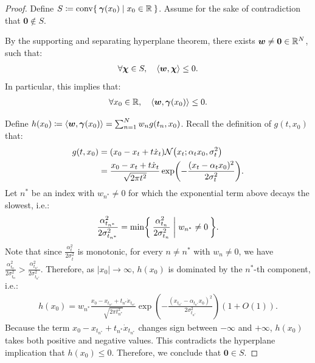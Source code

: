 \begin{proof}
Define $S \coloneqq \mathrm{conv} \Set{\vgamma(x_0) | x_0 \in \R }$.
Assume for the sake of contradiction that $\bm{0} \notin S$.

By the supporting and separating hyperplane theorem, there exists ${\bm{w}} \neq \bm{0} \in \mathbb{R}^N$, such that:
\begin{align}
    \forall {\bm{\chi}} \in S,\quad \langle {\bm{w}}, {\bm{\chi}} \rangle \leq 0.
\end{align}
In particular, this implies that:
\begin{align}
    \forall x_0 \in \mathbb{R},\quad \langle {\bm{w}}, {\bm{\gamma}}(x_0) \rangle \leq 0.
\end{align}

Define $h(x_0) \coloneqq \langle {\bm{w}}, {\bm{\gamma}}(x_0) \rangle = \sum_{n=1}^N w_n g(t_n,x_0)$. Recall the definition of $g(t,x_0)$ that:
\begin{align}
    g(t,x_0) &= (x_0 - x_t + t \dot{x}_t) \mathcal{N}\left(x_t; \alpha_t x_0, \sigma_t^2\right) \notag \\
    &= \frac{x_0 - x_t + t \dot{x}_t}{\sqrt{2\pi t^2}} \exp\left(-\frac{(x_t - \alpha_t x_0)^2}{2\sigma_t^2}\right).
\end{align}
Let $n^\ast$ be an index with $w_{n^\ast} \neq 0$ for which the exponential term above decays the slowest, i.e.:
\begin{align}
    \frac{\alpha_{t_{n^\ast}}^2}{2\sigma_{t_{n^\ast}}^2} = \min \Set{ \frac{\alpha_{t_n}^2}{2\sigma_{t_n}^2} | w_{n^\ast} \neq 0 }.
\end{align}
Note that since $\frac{\alpha_t^2}{2\sigma_t^2}$ is monotonic, for every $n \neq n^\ast$ with $w_n \neq 0$, we have $\frac{\alpha_{t_n}^2}{2\sigma_{t_n}^2} > \frac{\alpha_{t_{n^\ast}}^2}{2\sigma_{t_{n^\ast}}^2}$. Therefore, as $|x_0|\to\infty$, $h(x_0)$ is dominated by the $n^\ast$-th component, i.e.:
\begin{align}
    h(x_0) = w_{n^\ast} \frac{
        x_0 - x_{t_{n^\ast}} + t_{n^\ast} \dot{x}_{t_{n^\ast}}
    }{
        \sqrt{2 \pi t_{n^\ast}^2}
    } \exp\left(-\frac{(x_{t_{n^\ast}} - \alpha_{t_{n^\ast}} x_0)^2}{2\sigma_{t_{n^\ast}}^2}\right)(1+O(1)).
\end{align}
Because the term $x_0 - x_{t_{n^\ast}} + t_{n^\ast} \dot{x}_{t_{n^\ast}}$ changes sign between $-\infty$ and $+\infty$, $h(x_0)$ takes both positive and negative values. This contradicts the hyperplane implication that $h(x_0) \leq 0$. Therefore, we conclude that $\bm{0} \in S$.
\end{proof}

